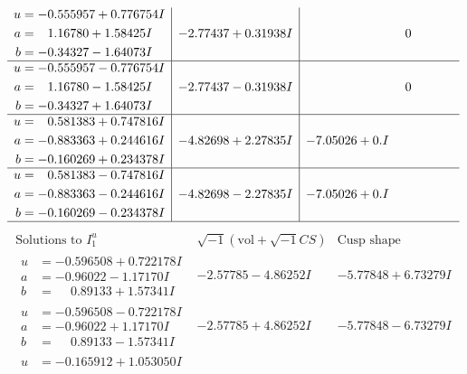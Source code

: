 \documentclass[1p]{elsarticle_modified}
\theoremstyle{definition}
\newcommand{\I}{\sqrt{-1}}
\begin{document}
$$\begin{array}{c|c|c}
\begin{aligned}
u &= -0.555957 + 0.776754 I \\
a &= \phantom{-}1.16780 + 1.58425 I \\
b &= -0.34327 - 1.64073 I\end{aligned}
 & -2.77437 + 0.31938 I & \phantom{-0.000000 } 0 \\ \hline\begin{aligned}
u &= -0.555957 - 0.776754 I \\
a &= \phantom{-}1.16780 - 1.58425 I \\
b &= -0.34327 + 1.64073 I\end{aligned}
 & -2.77437 - 0.31938 I & \phantom{-0.000000 } 0 \\ \hline\begin{aligned}
u &= \phantom{-}0.581383 + 0.747816 I \\
a &= -0.883363 + 0.244616 I \\
b &= -0.160269 + 0.234378 I\end{aligned}
 & -4.82698 + 2.27835 I & -7.05026 + 0. I\phantom{ +0.000000I} \\ \hline\begin{aligned}
u &= \phantom{-}0.581383 - 0.747816 I \\
a &= -0.883363 - 0.244616 I \\
b &= -0.160269 - 0.234378 I\end{aligned}
 & -4.82698 - 2.27835 I & -7.05026 + 0. I\phantom{ +0.000000I}\\
 \hline 
 \end{array}$$\newpage$$\begin{array}{c|c|c}  
\text{Solutions to }I^u_{1}& \I (\text{vol} + \sqrt{-1}CS) & \text{Cusp shape}\\
 \hline 
\begin{aligned}
u &= -0.596508 + 0.722178 I \\
a &= -0.96022 - 1.17170 I \\
b &= \phantom{-}0.89133 + 1.57341 I\end{aligned}
 & -2.57785 - 4.86252 I & -5.77848 + 6.73279 I \\ \hline\begin{aligned}
u &= -0.596508 - 0.722178 I \\
a &= -0.96022 + 1.17170 I \\
b &= \phantom{-}0.89133 - 1.57341 I\end{aligned}
 & -2.57785 + 4.86252 I & -5.77848 - 6.73279 I \\ \hline\begin{aligned}
u &= -0.165912 + 1.053050 I \\

\end{aligned}
\end{array}$$
\end{document}
